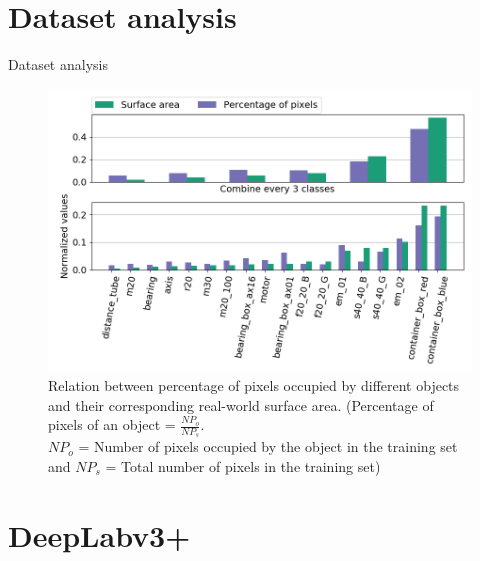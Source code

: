 \documentclass{beamer}
\begin{document}
\section{Dataset analysis}

\begin{frame}{Dataset analysis}
\label{slide:analysis}
	
	\begin{figure}
		\centering
		\includegraphics[scale=0.35]{images/analyzer_full}
		\caption{Relation between percentage of pixels occupied by different objects and their corresponding real-world surface area. (Percentage of pixels of an object = $\frac{NP_o}{NP_s}$. \\
		$NP_o$ = Number of pixels occupied by the object in the training set and $NP_s$ = Total number of pixels in the training set)}
		\label{Fig:surarea}
	\end{figure}

\end{frame}

\section{DeepLabv3+}
\end{document}
